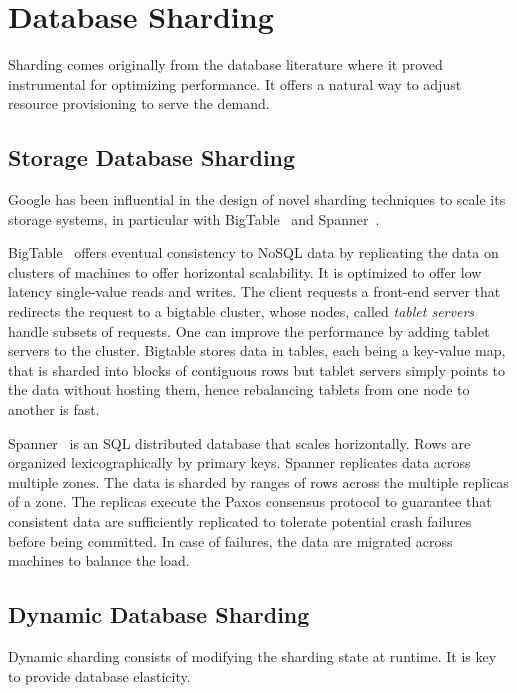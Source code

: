 \documentclass[11pt,dvipdfm]{article}
\begin{document}
\section{Database Sharding}\label{sec:db}

Sharding comes originally from the database literature where it proved instrumental for optimizing performance. It offers a natural way to adjust resource provisioning to serve the demand.

\subsection{Storage Database Sharding}

Google has been influential in the design of novel sharding techniques to scale its storage systems, in particular with BigTable~\cite{CDG08} and Spanner~\cite{CDE13}.

BigTable~\cite{CDG08} offers eventual consistency to NoSQL data by replicating the data on clusters of machines to offer horizontal scalability.
It is optimized to offer low latency single-value reads and writes. %
The client requests a front-end server that 
redirects the request to a bigtable cluster, whose nodes, called \emph{tablet servers} handle subsets of requests. 
One can improve the performance by adding tablet servers to the cluster. 
Bigtable stores data in tables, each being a key-value map, that is sharded into blocks of contiguous rows but tablet servers simply points to the data without hosting them, hence rebalancing tablets from one node to another is fast.

Spanner~\cite{CDE13} is an SQL distributed database that scales horizontally. 
Rows are organized 	lexicographically by primary keys. Spanner replicates data across multiple zones.
The data is sharded by ranges of rows across the multiple replicas of a zone.
The replicas execute the Paxos consensus protocol to guarantee that consistent data are sufficiently replicated to tolerate potential crash failures before being committed. In case of failures, the data are migrated across machines to balance the load.

\subsection{Dynamic Database Sharding}

Dynamic sharding consists of modifying the sharding state at runtime. It is key to provide database elasticity.
\end{document}
